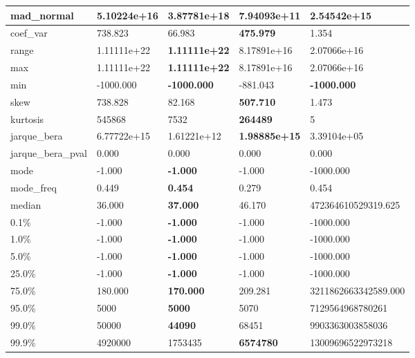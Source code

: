 \begin{table}[H]
\begin{tabular}{|l|m{10em}|m{10em}|m{10em}|m{10em}|}
\hline mad\_normal & 5.10224e+16 & \cellcolor[rgb]{0.9, 0.54, 0.52} 3.87781e+18 & 7.94093e+11 & \bfseries 2.54542e+15 \\
\hline coef\_var & 738.823 & 66.983 & \bfseries 475.979 & \cellcolor[rgb]{0.9, 0.54, 0.52} 1.354 \\
\hline range & 1.11111e+22 & \bfseries 1.11111e+22 & 8.17891e+16 & \cellcolor[rgb]{0.9, 0.54, 0.52} 2.07066e+16 \\
\hline max & 1.11111e+22 & \bfseries 1.11111e+22 & 8.17891e+16 & \cellcolor[rgb]{0.9, 0.54, 0.52} 2.07066e+16 \\
\hline min & -1000.000 & \bfseries -1000.000 & \cellcolor[rgb]{0.9, 0.54, 0.52} -881.043 & \bfseries -1000.000 \\
\hline skew & 738.828 & 82.168 & \bfseries 507.710 & \cellcolor[rgb]{0.9, 0.54, 0.52} 1.473 \\
\hline kurtosis & 545868 & 7532 & \bfseries 264489 & \cellcolor[rgb]{0.9, 0.54, 0.52} 5 \\
\hline jarque\_bera & 6.77722e+15 & 1.61221e+12 & \bfseries 1.98885e+15 & \cellcolor[rgb]{0.9, 0.54, 0.52} 3.39104e+05 \\
\hline jarque\_bera\_pval & 0.000 & 0.000 & 0.000 & 0.000 \\
\hline mode & -1.000 & \bfseries -1.000 & -1.000 & \cellcolor[rgb]{0.9, 0.54, 0.52} -1000.000 \\
\hline mode\_freq & 0.449 & \bfseries 0.454 & \cellcolor[rgb]{0.9, 0.54, 0.52} 0.279 & 0.454 \\
\hline median & 36.000 & \bfseries 37.000 & 46.170 & \cellcolor[rgb]{0.9, 0.54, 0.52} 472364610529319.625 \\
\hline 0.1\% & -1.000 & \bfseries -1.000 & -1.000 & \cellcolor[rgb]{0.9, 0.54, 0.52} -1000.000 \\
\hline 1.0\% & -1.000 & \bfseries -1.000 & -1.000 & \cellcolor[rgb]{0.9, 0.54, 0.52} -1000.000 \\
\hline 5.0\% & -1.000 & \bfseries -1.000 & -1.000 & \cellcolor[rgb]{0.9, 0.54, 0.52} -1000.000 \\
\hline 25.0\% & -1.000 & \bfseries -1.000 & -1.000 & \cellcolor[rgb]{0.9, 0.54, 0.52} -1000.000 \\
\hline 75.0\% & 180.000 & \bfseries 170.000 & 209.281 & \cellcolor[rgb]{0.9, 0.54, 0.52} 3211862663342589.000 \\
\hline 95.0\% & 5000 & \bfseries 5000 & 5070 & \cellcolor[rgb]{0.9, 0.54, 0.52} 7129564968780261 \\
\hline 99.0\% & 50000 & \bfseries 44090 & 68451 & \cellcolor[rgb]{0.9, 0.54, 0.52} 9903363003858036 \\
\hline 99.9\% & 4920000 & 1753435 & \bfseries 6574780 & \cellcolor[rgb]{0.9, 0.54, 0.52} 13009696522973218 \\
\hline
\end{tabular}
\end{table}
